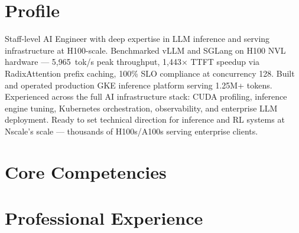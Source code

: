 \documentclass[11pt,a4paper]{moderncv}
\begin{document}
\makecvtitle

\section{Profile}
Staff-level AI Engineer with deep expertise in LLM inference and serving infrastructure at H100-scale. Benchmarked vLLM and SGLang on H100 NVL hardware — 5,965~tok/s peak throughput, 1,443$\times$ TTFT speedup via RadixAttention prefix caching, 100\% SLO compliance at concurrency 128. Built and operated production GKE inference platform serving 1.25M+ tokens. Experienced across the full AI infrastructure stack: CUDA profiling, inference engine tuning, Kubernetes orchestration, observability, and enterprise LLM deployment. Ready to set technical direction for inference and RL systems at Nscale's scale — thousands of H100s/A100s serving enterprise clients.

\section{Core Competencies}

\section{Professional Experience}
\end{document}
